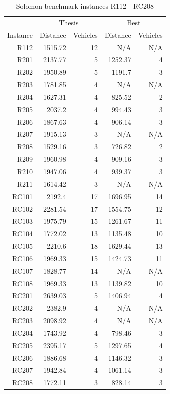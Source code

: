\documentclass[a4paper,twoside,12pt]{book}
\begin{document}
\begin{table}
\centering
\caption{Solomon benchmark instances R112 - RC208}
\label{tab:solomonPart2}
\begin{tabular}{rrrrr}
\toprule
	         &\multicolumn{2}{c}{Thesis} & \multicolumn{2}{c}{Best} \\
	         \cmidrule(r){2-3}\cmidrule(r){4-5}
	Instance &     Distance &  Vehicles & Distance & Vehicles \\
\midrule
 R112 & 1515.72 & 12 & N/A & N/A \\ 
 R201 & 2137.77 & 5 & 1252.37 & 4 \\ 
 R202 & 1950.89 & 5 & 1191.7 & 3 \\ 
 R203 & 1781.85 & 4 & N/A & N/A \\ 
 R204 & 1627.31 & 4 & 825.52 & 2 \\ 
 R205 & 2037.2 & 4 & 994.43 & 3 \\ 
 R206 & 1867.63 & 4 & 906.14 & 3 \\ 
 R207 & 1915.13 & 3 & N/A & N/A \\ 
 R208 & 1529.16 & 3 & 726.82 & 2 \\ 
 R209 & 1960.98 & 4 & 909.16 & 3 \\ 
 R210 & 1947.06 & 4 & 939.37 & 3 \\ 
 R211 & 1614.42 & 3 & N/A & N/A \\ 
 RC101 & 2192.4 & 17 & 1696.95 & 14 \\ 
 RC102 & 2281.54 & 17 & 1554.75 & 12 \\ 
 RC103 & 1975.79 & 15 & 1261.67 & 11 \\ 
 RC104 & 1772.02 & 13 & 1135.48 & 10 \\ 
 RC105 & 2210.6 & 18 & 1629.44 & 13 \\ 
 RC106 & 1969.33 & 15 & 1424.73 & 11 \\ 
 RC107 & 1828.77 & 14 & N/A & N/A \\ 
 RC108 & 1969.33 & 13 & 1139.82 & 10 \\ 
 RC201 & 2639.03 & 5 & 1406.94 & 4 \\ 
 RC202 & 2382.9 & 4 & N/A & N/A \\ 
 RC203 & 2098.92 & 4 & N/A & N/A \\ 
 RC204 & 1743.92 & 4 & 798.46 & 3 \\ 
 RC205 & 2395.17 & 5 & 1297.65 & 4 \\ 
 RC206 & 1886.68 & 4 & 1146.32 & 3 \\ 
 RC207 & 1942.84 & 4 & 1061.14 & 3 \\ 
 RC208 & 1772.11 & 3 & 828.14 & 3 \\ 
\bottomrule
\end{tabular}
\end{table}  
\end{document}
